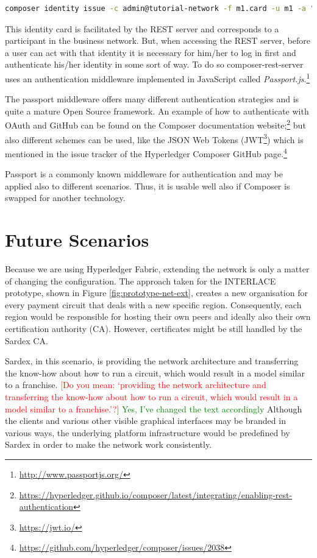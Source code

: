 \begin{lstlisting}[language=bash]
	composer identity issue -c admin@tutorial-network -f m1.card -u m1 -a "resource:net.sardex.interlace.Individual#m1" -x true 
\end{lstlisting}

This identity card is facilitated by the REST server and corresponds to a participant in the business network. 
But, when accessing the REST server, before a user can act with that identity it is necessary for him/her to log in first and authenticate his/her identity in some sort of way. To do so composer-rest-server uses an authentication middleware implemented in JavaScript called \textit{Passport.js}.\footnote{\url{http://www.passportjs.org/}}

The passport middleware offers many different authentication strategies and is quite a mature Open Source framework. An example of how to authenticate with OAuth and GitHub can be found on the Composer documentation website;\footnote{\url{https://hyperledger.github.io/composer/latest/integrating/enabling-rest-authentication}} but also different schemes can be used, like the JSON Web Tokens (JWT\footnote{\url{https://jwt.io/}}) which is mentioned in the issue tracker of the Hyperledger Composer GitHub page.\footnote{\url{https://github.com/hyperledger/composer/issues/2038}}

Passport is a commonly known middleware for authentication and may be applied also to different scenarios. Thus, it is usable well also if Composer is swapped for another technology.

\section{Future Scenarios}
\label{sec:future-scene}

Because we are using Hyperledger Fabric, extending the network is only a matter of changing the configuration. The approach taken for the INTERLACE prototype, shown in Figure \ref{fig:prototype-net-ext}, creates a new organisation for every payment circuit that deals with a new specific region. Consequently, each region would be responsible for hosting their own peers and ideally also their own certification authority (CA). However, certificates might be still handled by the Sardex CA. 

Sardex, in this scenario, is providing the network architecture and transferring the know-how about how to run a circuit, which would result in a model similar to a franchise. \textcolor{red}{[Do you mean: `providing the network architecture and transferring the know-how about how to run a circuit, which would result in a model similar to a franchise.'?]} \textcolor{green}{Yes, I've changed the text accordingly} Although the clients and various other visible graphical interfaces may be branded in various ways, the underlying platform infrastructure would be predefined by Sardex in order to make the network work consistently.

